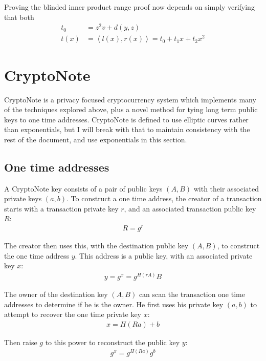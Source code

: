 \documentclass{article}
\begin{document}
Proving the blinded inner product range proof now depends on simply verifying that both 
\begin{align}
  t_0 &= z^2 v + d(y,z)\\
  t(x) &= \left<l(x), r(x)\right> = t_0 + t_1 x + t_2 x^2
\end{align}



\section{CryptoNote}

CryptoNote \cite{cryptonote} is a privacy focused cryptocurrency system which implements many of the techniques explored above, plus a novel method for tying long term public keys to one time addresses.  CryptoNote is defined to use elliptic curves rather than exponentials, but I will break with that to maintain consistency with the rest of the document, and use exponentials in this section.


\subsection{One time addresses}

A CryptoNote key consists of a pair of public keys $(A, B)$ with their associated private keys $(a, b)$.  To construct a one time address, the creator of a transaction starts with a transaction private key $r$, and an associated transaction public key $R$:
\begin{align}
  R=g^r
\end{align}

The creator then uses this, with the destination public key $(A, B)$, to construct the one time address $y$.  This address is a public key, with an associated private key $x$:
\begin{align}
  y = g^x = g^{H(rA)} B
\end{align}

The owner of the destination key $(A, B)$ can scan the transaction one time addresses to determine if he is the owner.  He first uses his private key $(a, b)$ to attempt to recover the one time private key $x$:
\begin{align}
	x = H(Ra) + b
\end{align}

Then raise $g$ to this power to reconstruct the public key $y$:
\begin{align}
  g^x = g^{H(Ra)} g^b
\end{align}
\end{document}
